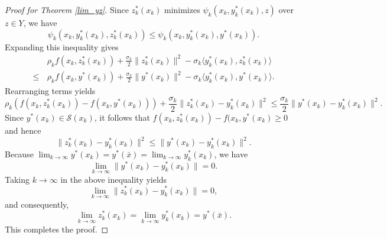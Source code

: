 \documentclass[10pt,a4paper]{amsart}
\begin{document}
\begin{proof}[Proof for Theorem \ref{lim_yz}]
Since $z_k^*(x_k)$ minimizes $\psi_{k}(x_k, y_k^*(x_k), z)$ over $z \in Y$, we have
    \[
    \psi_k (x_k,y_k^*(x_k), z_k^*(x_k)) \le \psi_k (x_k,y_k^*(x_k), y^*(x_k)).
    \]
Expanding this inequality gives
\[
\begin{aligned}
     &\rho_k f(x_k, z_k^*(x_k) ) + \frac{\sigma_k}{2}\| z_k^*(x_k) \|^2 - \sigma_k \langle y_k^*(x_k) , z_k^*(x_k) \rangle \\
     \le \, &\rho_k f(x_k, y^*(x_k) )+ \frac{\sigma_k}{2}\| y^*(x_k)\|^2 - \sigma_k \langle y_k^*(x_k) ,y^*(x_k) \rangle .
\end{aligned}
\]
Rearranging terms yields  
\[
    \rho_k \left( f(x_k, z_k^*(x_k) )  - f(x_k, y^*(x_k) ) \right) + \frac{\sigma_k}{2}\|z_k^*(x_k) - y_k^*(x_k)\|^2 \le \frac{\sigma_k}{2}\| y^*(x_k) - y_k^*(x_k) \|^2.
\]
Since $y^*(x_k) \in \mathcal{S}(x_k)$, it follows that $f(x_k, z_k^*(x_k) )  - f(x_k, y^*(x_k) \ge 0$ and hence
\[
\|z_k^*(x_k) - y_k^*(x_k)\|^2 \le \| y^*(x_k) - y_k^*(x_k) \|^2.
\]
Because $\lim_{k \to\infty}y^*(x_k)=y^*(\bar{x}) = \lim_{k \to\infty}y_k^*(x_k)$, we have 
\[
\lim_{k \to\infty} \| y^*(x_k) - y_k^*(x_k) \| = 0.
\]
Taking $k \rightarrow \infty$ in the above inequality yields  
\[
\lim_{k \to\infty}  \|z_k^*(x_k) - y_k^*(x_k)\| =0,
\]
and consequently,
\[
\lim_{k \to\infty}z_k^*(x_k) = \lim_{k \to\infty}y_k^*(x_k) = y^*(\bar{x}).
\]
This completes the proof.
        

\end{proof}
\end{document}
